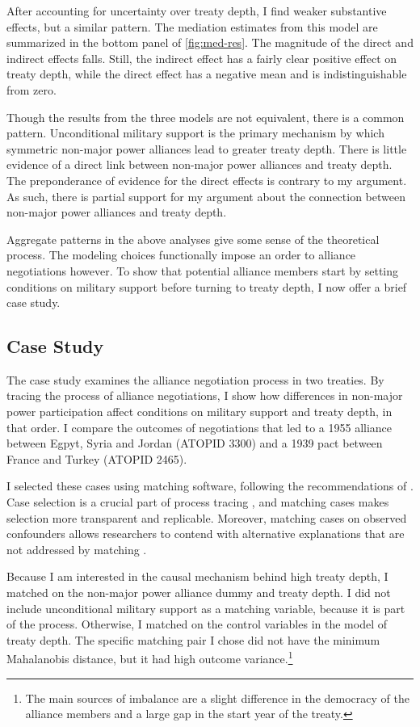 \documentclass[12pt]{article}
\begin{document}
After accounting for uncertainty over treaty depth, I find weaker substantive effects, but a similar pattern. 
The mediation estimates from this model are summarized in the bottom panel of \autoref{fig:med-res}. 
The magnitude of the direct and indirect effects falls. 
Still, the indirect effect has a fairly clear positive effect on treaty depth, while the direct effect has a negative mean and is indistinguishable from zero. 


Though the results from the three models are not equivalent, there is a common pattern. 
Unconditional military support is the primary mechanism by which symmetric non-major power alliances lead to greater treaty depth. 
There is little evidence of a direct link between non-major power alliances and treaty depth. 
The preponderance of evidence for the direct effects is contrary to my argument. 
As such, there is partial support for my argument about the connection between non-major power alliances and treaty depth. 


Aggregate patterns in the above analyses give some sense of the theoretical process. 
The modeling choices functionally impose an order to alliance negotiations however. 
To show that potential alliance members start by setting conditions on military support before turning to treaty depth, I now offer a brief case study. 


\subsection{Case Study}

The case study examines the alliance negotiation process in two treaties. 
By tracing the process of alliance negotiations, I show how differences in non-major power participation affect conditions on military support and treaty depth, in that order. 
I compare the outcomes of negotiations that led to a 1955 alliance between Egpyt, Syria and Jordan (ATOPID 3300) and a 1939 pact between France and Turkey (ATOPID 2465). 



I selected these cases using matching software, following the recommendations of \citet{Nielsen2016}. 
Case selection is a crucial part of process tracing \citep{SeawrightGerring2008}, and matching cases makes selection more transparent and replicable. 
Moreover, matching cases on observed confounders allows researchers to contend with alternative explanations that are not addressed by matching \citep{Nielsen2016}. 


Because I am interested in the causal mechanism behind high treaty depth, I matched on the non-major power alliance dummy and treaty depth. 
I did not include unconditional military support as a matching variable, because it is part of the process. 
Otherwise, I matched on the control variables in the model of treaty depth. 
The specific matching pair I chose did not have the minimum Mahalanobis distance, but it had high outcome variance.\footnote{The main sources of imbalance are a slight difference in the democracy of the alliance members and a large gap in the start year of the treaty.} 
\end{document}
